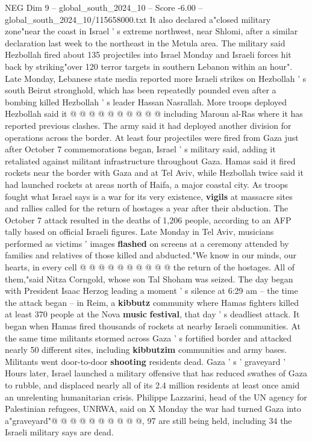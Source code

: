 \begin{textsample}{NEG Dim 9 – global\_south\_2024\_10 – Score -6.00 – global\_south\_2024\_10/115658000.txt}
It also declared a"closed military zone"near the coast in Israel ' s extreme northwest, near Shlomi, after a similar declaration last week to the northeast in the Metula area.
The military said Hezbollah fired about 135 projectiles into Israel Monday and Israeli forces hit back by striking"over 120 terror targets in southern Lebanon within an hour".
Late Monday, Lebanese state media reported more Israeli strikes on Hezbollah ' s south Beirut stronghold, which has been repeatedly pounded even after a bombing killed Hezbollah ' s leader Hassan Nasrallah.
More troops deployed Hezbollah said it @ @ @ @ @ @ @ @ @ @ including Maroun al-Ras where it has reported previous clashes.
The army said it had deployed another division for operations across the border.
At least four projectiles were fired from Gaza just after October 7 commemorations began, Israel ' s military said, adding it retaliated against militant infrastructure throughout Gaza.
Hamas said it fired rockets near the border with Gaza and at Tel Aviv, while Hezbollah twice said it had launched rockets at areas north of Haifa, a major coastal city.
As troops fought what Israel says is a war for its very existence, \textbf{vigils} at massacre sites and rallies called for the return of hostages a year after their abduction.
The October 7 attack resulted in the deaths of 1,206 people, according to an AFP tally based on official Israeli figures.
Late Monday in Tel Aviv, musicians performed as victims ' images \textbf{flashed} on screens at a ceremony attended by families and relatives of those killed and abducted."We know in our minds, our hearts, in every cell @ @ @ @ @ @ @ @ @ @ the return of the hostages.
All of them,"said Nitza Corngold, whose son Tal Shoham was seized.
The day began with President Isaac Herzog leading a moment ' s silence at 6:29 am -- the time the attack began -- in Reim, a \textbf{kibbutz} community where Hamas fighters killed at least 370 people at the Nova \textbf{music} \textbf{festival}, that day ' s deadliest attack.
It began when Hamas fired thousands of rockets at nearby Israeli communities.
At the same time militants stormed across Gaza ' s fortified border and attacked nearly 50 different sites, including \textbf{kibbutzim} communities and army bases.
Militants went door-to-door \textbf{shooting} residents dead.
Gaza ' s ' graveyard ' Hours later, Israel launched a military offensive that has reduced swathes of Gaza to rubble, and displaced nearly all of its 2.4 million residents at least once amid an unrelenting humanitarian crisis.
Philippe Lazzarini, head of the UN agency for Palestinian refugees, UNRWA, said on X Monday the war had turned Gaza into a"graveyard"@ @ @ @ @ @ @ @ @ @, 97 are still being held, including 34 the Israeli military says are dead.

\end{textsample}
